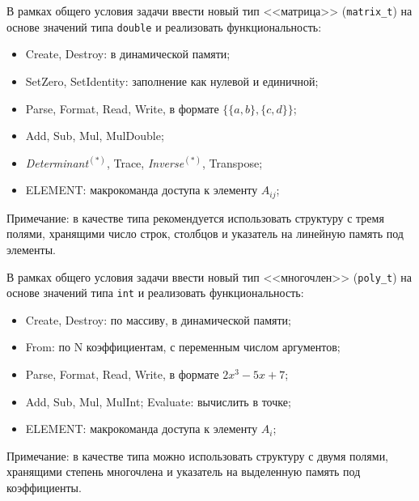 
\begin{zztask}
В рамках общего условия задачи ввести новый тип <<матрица>>
(\texttt{matrix\_t}) на основе значений типа \texttt{double} и реализовать
функциональность:
%
\begin{itemize}
\item Create, Destroy: в динамической памяти;
\item SetZero, SetIdentity: заполнение как нулевой и единичной;
\item Parse, Format, Read, Write, в формате $\{\{a,b\},\{c,d\}\}$;
\item Add, Sub, Mul, MulDouble;
\item \textit{Determinant}${}^{(\ast)}$, Trace, \textit{Inverse}${}^{(\ast)}$, Transpose;
\item ELEMENT: макрокоманда доступа к элементу $A_{ij}$;
\end{itemize}
%
Примечание: в качестве типа рекомендуется использовать структуру с тремя
полями, хранящими число строк, столбцов и указатель на линейную память под
элементы.
\end{zztask}


\begin{zztask}[Многочлены]
В рамках общего условия задачи ввести новый тип <<многочлен>>
(\texttt{poly\_t}) на основе значений типа \texttt{int} и реализовать
функциональность:
%
\begin{itemize}
\item Create, Destroy: по массиву, в динамической памяти;
\item From: по N коэффициентам, с переменным числом аргументов;
\item Parse, Format, Read, Write, в формате $2x^3 - 5x + 7$;
\item Add, Sub, Mul, MulInt; Evaluate: вычислить в точке;
\item ELEMENT: макрокоманда доступа к элементу $A_{i}$;
\end{itemize}
%
Примечание: в качестве типа можно использовать структуру с двумя полями,
хранящими степень многочлена и указатель на выделенную память под
коэффициенты.
\end{zztask}

